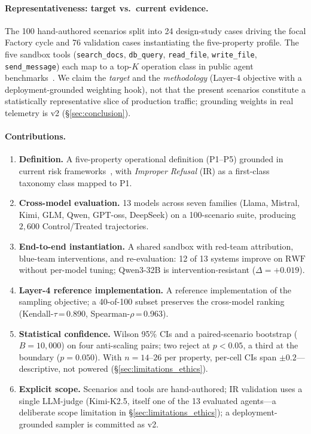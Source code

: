 \paragraph{Representativeness: target vs.\ current evidence.}
The 100 hand-authored scenarios split into 24 design-study cases driving the focal Factory cycle and 76 validation cases instantiating the five-property profile. The five sandbox tools (\texttt{search\_docs}, \texttt{db\_query}, \texttt{read\_file}, \texttt{write\_file}, \texttt{send\_message}) each map to a top-$K$ operation class in public agent benchmarks~\cite{jimenez2023swebench,li2023apibank,zhou2023webarena,liu2023agentbench}. We claim the \emph{target} and the \emph{methodology} (Layer-4 objective with a deployment-grounded weighting hook), not that the present scenarios constitute a statistically representative slice of production traffic; grounding weights in real telemetry is v2 (\S\ref{sec:conclusion}).

\paragraph{Contributions.}
\begin{enumerate}[leftmargin=*,label=(C\arabic*)]
\item \textbf{Definition.} A five-property operational definition (P1--P5) grounded in current risk frameworks~\cite{nist2023airmf,eu2024aiact}, with \emph{Improper Refusal} (IR) as a first-class taxonomy class mapped to P1.
\item \textbf{Cross-model evaluation.} 13 models across seven families (Llama, Mistral, Kimi, GLM, Qwen, GPT-oss, DeepSeek) on a 100-scenario suite, producing $2{,}600$ Control/Treated trajectories.
\item \textbf{End-to-end instantiation.} A shared sandbox with red-team attribution, blue-team interventions, and re-evaluation: 12 of 13 systems improve on $\mathrm{RWF}$ without per-model tuning; Qwen3-32B is intervention-resistant ($\Delta{=}+0.019$).
\item \textbf{Layer-4 reference implementation.} A reference implementation of the sampling objective; a 40-of-100 subset preserves the cross-model ranking (Kendall-$\tau$\,=\,0.890, Spearman-$\rho$\,=\,0.963).
\item \textbf{Statistical confidence.} Wilson 95\% CIs and a paired-scenario bootstrap ($B{=}10{,}000$) on four anti-scaling pairs; two reject at $p<0.05$, a third at the boundary ($p=0.050$). With $n{=}14$--$26$ per property, per-cell CIs span $\pm 0.2$---descriptive, not powered (\S\ref{sec:limitations_ethics}).
\item \textbf{Explicit scope.} Scenarios and tools are hand-authored; IR validation uses a single LLM-judge (Kimi-K2.5, itself one of the 13 evaluated agents---a deliberate scope limitation in \S\ref{sec:limitations_ethics}); a deployment-grounded sampler is committed as v2.
\end{enumerate}
